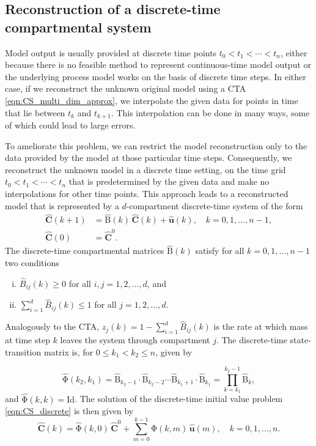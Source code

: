 \documentclass[draft]{agujournal2019}
\renewcommand{\vec}[1]{\mathbf{#1}}
\newcommand{\tens}[1]{\mathrm{#1}}
\newcommand{\id}{\tens{Id}}
\newcommand{\suml}{\sum\limits}
\begin{document}
\subsection{Reconstruction of a discrete-time compartmental system}
    Model output is usually provided at discrete time points $t_0<t_1<\cdots<t_n$, either because there is no feasible method to represent continuous-time model output or the underlying process model works on the basis of discrete time steps.
    In either case, if we reconstruct the unknown original model using a CTA \eqref{eqn:CS_multi_dim_approx}, we interpolate the given data for points in time that lie between $t_k$ and $t_{k+1}$.
    This interpolation can be done in many ways, some of which could lead to large errors. 

    To ameliorate this problem, we can restrict the model reconstruction only to the data provided by the model at those particular time steps.
    Consequently, we reconstruct the unknown model in a discrete time setting, on the time grid $t_0<t_1<\cdots<t_n$ that is predetermined by the given data and make no interpolations for  other time points.
    This approach leads to a reconstructed model that is represented by a $d$-compartment discrete-time system of the form
    \begin{equation}\label{eqn:CS_discrete}
        \begin{aligned}
            \widehat{\vec{C}}(k+1) &= \widehat{\tens{B}}(k)\,\widehat{\vec{C}}(k) + \widehat{\vec{u}}(k),\quad k=0,1,\ldots,n-1,\\
            \widehat{\vec{C}}(0) &= \widehat{\vec{C}}^0.
        \end{aligned}
    \end{equation}
    The discrete-time compartmental matrices $\widehat{\tens{B}}(k)$ satisfy for all $k=0,1,\ldots,n-1$ two conditions
     \begin{enumerate} [(i)]
        \item $\widehat{B}_{ij}(k)\geq0$ for all $i,j=1,2,\ldots,d$, and
        \item $\suml_{i=1}^d \widehat{B}_{ij}(k)\leq 1$ for all $j=1,2,\ldots,d$.
     \end{enumerate} 
    Analogously to the CTA, $\widehat{z}_j(k)=1-\sum_{i=1}^d \widehat{B}_{ij}(k)$ is the rate at which mass at time step $k$ leaves the system through compartment $j$.
    The discrete-time state-transition matrix is, for $0\leq k_1<k_2\leq n$, given by

    \begin{equation*}
        \widehat{\tens{\Phi}}(k_2,k_1) = \widehat{\tens{B}}_{k_2-1}\cdot\widehat{\tens{B}}_{k_2-2}\cdots\widehat{\tens{B}}_{k_1+1}\cdot\widehat{\tens{B}}_{k_1} = \prod\limits_{k=k_1}^{k_2-1}\widehat{\tens{B}}_k,
    \end{equation*}
    and $\widehat{\tens{\Phi}}(k,k)=\id$.
    The solution of the discrete-time initial value problem \eqref{eqn:CS_discrete} is then given by
    \begin{equation*}
        \widehat{\vec{C}}(k) = \widehat{\tens{\Phi}}(k,0)\,\widehat{\vec{C}}^0 + \suml_{m=0}^{k-1} \widehat{\tens{\Phi}}(k,m)\,\widehat{\vec{u}}(m),\quad k=0,1,\ldots,n.
    \end{equation*}
\end{document}
